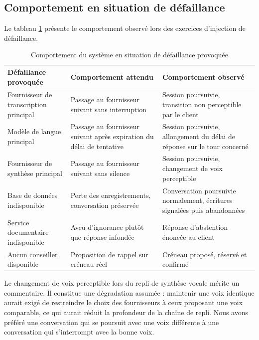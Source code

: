 \subsection{Comportement en situation de défaillance}

Le tableau \ref{tab:resilience} présente le comportement observé lors des exercices d'injection de défaillance.

\begin{table}[H]
\centering
\renewcommand{\arraystretch}{1.25}
\begin{tabular}{|p{4.0cm}|p{5.2cm}|p{5.3cm}|}
\hline
\textbf{Défaillance provoquée} & \textbf{Comportement attendu} & \textbf{Comportement observé} \\
\hline
Fournisseur de transcription principal & Passage au fournisseur suivant sans interruption & Session poursuivie, transition non perceptible par le client \\
\hline
Modèle de langue principal & Passage au fournisseur suivant après expiration du délai de tentative & Session poursuivie, allongement du délai de réponse sur le tour concerné \\
\hline
Fournisseur de synthèse principal & Passage au fournisseur suivant sans silence & Session poursuivie, changement de voix perceptible \\
\hline
Base de données indisponible & Perte des enregistrements, conversation préservée & Conversation poursuivie normalement, écritures signalées puis abandonnées \\
\hline
Service documentaire indisponible & Aveu d'ignorance plutôt que réponse infondée & Réponse d'abstention énoncée au client \\
\hline
Aucun conseiller disponible & Proposition de rappel sur créneau réel & Créneau proposé, réservé et confirmé \\
\hline
\end{tabular}
\caption{Comportement du système en situation de défaillance provoquée}
\label{tab:resilience}
\end{table}

Le changement de voix perceptible lors du repli de synthèse vocale mérite un commentaire. Il constitue une dégradation assumée : maintenir une voix identique aurait exigé de restreindre le choix des fournisseurs à ceux proposant une voix comparable, ce qui aurait réduit la profondeur de la chaîne de repli. Nous avons préféré une conversation qui se poursuit avec une voix différente à une conversation qui s'interrompt avec la bonne voix.

